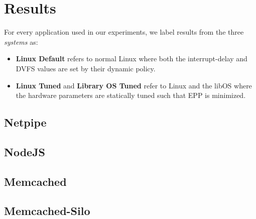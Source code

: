 \section{Results}
\label{sec:results}

For every application used in our experiments, we label results from the  three \textit{systems} as:
\begin{itemize}
    \item \textbf{Linux Default} refers to normal Linux where both the interrupt-delay and DVFS values are set by their dynamic policy.
    \item \textbf{Linux Tuned} and \textbf{Library OS Tuned} refer to Linux and the libOS where the hardware parameters are statically tuned such that EPP is minimized.
\end{itemize}

\subsection{Netpipe}
\label{sec:results:netpipe}


\subsection{NodeJS}
\label{sec:results:nodejs}


\subsection{Memcached}
\label{sec:results:mcd}


\subsection{Memcached-Silo}
\label{sec:results:mcdsilo}





